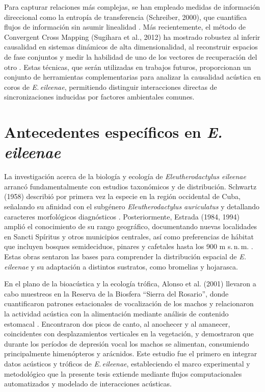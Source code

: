 Para capturar relaciones más complejas, se han empleado medidas de 
información direccional como la entropía de transferencia 
(Schreiber, 2000), que cuantifica flujos de información sin 
asumir linealidad \cite{schreiber2000measuring}. Más recientemente, el 
método de Convergent Cross Mapping (Sugihara et al., 2012) ha 
mostrado robustez al inferir causalidad en sistemas dinámicos de 
alta dimensionalidad, al reconstruir espacios de fase conjuntos 
y medir la habilidad de uno de los vectores de recuperación del 
otro \cite{sugihara2012detecting}. Estas técnicas, que serán
utilizadas en trabajos futuros, proporcionan un 
conjunto de herramientas complementarias para analizar la 
causalidad acústica en coros de \emph{E.\,eileenae}, permitiendo 
distinguir interacciones directas de sincronizaciones inducidas 
por factores ambientales comunes.

\section{Antecedentes específicos en \emph{E.\,eileenae}}
\label{sec:antecedentes_eileenae}

La investigación acerca de la biología y ecología de 
\emph{Eleutherodactylus eileenae} arrancó fundamentalmente con 
estudios taxonómicos y de distribución. Schwartz (1958) 
describió por primera vez la especie en la región occidental de 
Cuba, señalando su afinidad con el subgénero 
\emph{Eleutherodactylus auriculatus} y detallando caracteres 
morfológicos diagnósticos \cite{schwartz1958new}. Posteriormente, 
Estrada (1984, 1994) amplió el conocimiento de su rango 
geográfico, documentando nuevas localidades en Sancti Spíritus 
y otros municipios centrales, así como preferencias de hábitat 
que incluyen bosques semideciduos, pinares y cafetales hasta 
los 900 m s.\,n.\,m. \cite{estrada1984nuevas,estrada1994herpetofauna}. 
Estas obras sentaron las bases para comprender la distribución 
espacial de \emph{E.\,eileenae} y su adaptación a distintos 
sustratos, como bromelias y hojarasca.

En el plano de la bioacústica y la ecología trófica, Alonso et 
al. (2001) llevaron a cabo muestreos en la Reserva de la 
Biosfera “Sierra del Rosario”, donde cuantificaron patrones estacionales 
de vocalización de los machos y 
relacionaron la actividad acústica con la alimentación mediante 
análisis de contenido estomacal \cite{alonso2001patrones}. Encontraron 
dos picos de canto, al anochecer y al amanecer, coincidentes 
con desplazamientos verticales en la vegetación, y demostraron 
que durante los períodos de depresión vocal los machos se 
alimentan, consumiendo principalmente himenópteros y arácnidos. 
Este estudio fue el primero en integrar datos acústicos y 
tróficos de \emph{E.\,eileenae}, estableciendo el marco 
experimental y metodológico que la presente tesis extiende 
mediante flujos computacionales automatizados y modelado de 
interacciones acústicas.
















